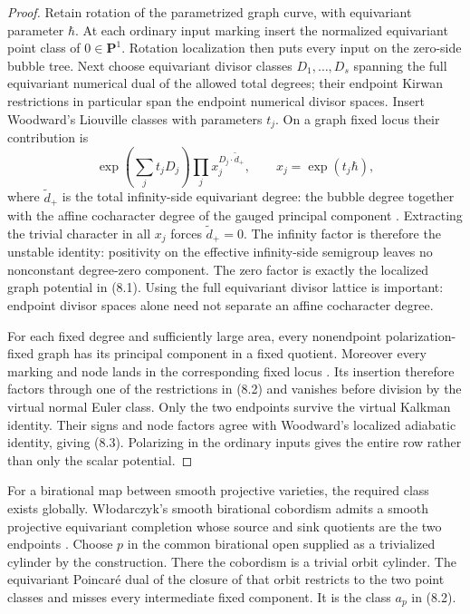 \begin{proof}
Retain rotation of the parametrized graph curve, with equivariant parameter
\(\hbar\).  At each ordinary input marking insert the normalized equivariant
point class of \(0\in\mathbf P^1\).  Rotation localization then puts every
input on the zero-side bubble tree.  Next choose equivariant divisor classes
\(D_1,\ldots,D_s\) spanning the full equivariant numerical dual of the
allowed total degrees; their endpoint Kirwan restrictions in particular span
the endpoint numerical divisor spaces.  Insert Woodward's Liouville classes
with parameters \(t_j\).  On a graph fixed locus their contribution is
\[
 \exp\!\left(\sum_jt_jD_j\right)
 \prod_j x_j^{D_j\cdot \widetilde d_+},
 \qquad x_j=\exp(t_j\hbar),                                  \tag{8.4}
\]
where \(\widetilde d_+\) is the total infinity-side equivariant degree: the
bubble degree together with the affine cocharacter degree of the gauged
principal component \cite[Corollary~9.10(c)]{WoodwardQKIII}.  Extracting the
trivial character in all \(x_j\) forces \(\widetilde d_+=0\).  The infinity
factor is therefore the unstable identity: positivity on the effective
infinity-side semigroup leaves no nonconstant degree-zero component.  The
zero factor is exactly the localized graph potential in (8.1).  Using the
full equivariant divisor lattice is important: endpoint divisor spaces alone
need not separate an affine cocharacter degree.

For each fixed degree and sufficiently large area, every nonendpoint
polarization-fixed graph has its principal component in a fixed quotient.
Moreover every marking and node lands in the corresponding fixed locus
\cite[Proposition~3.15(c), Lemma~3.17 and
Proposition~3.18]{GonzalezWoodward}.  Its insertion therefore factors through
one of the restrictions in (8.2) and vanishes before division by the virtual
normal Euler class.  Only the two endpoints survive the virtual Kalkman
identity.  Their signs and node factors agree with Woodward's localized
adiabatic identity, giving (8.3).  Polarizing in the ordinary inputs gives
the entire row rather than only the scalar potential.
\end{proof}

For a birational map between smooth projective varieties, the required class
exists globally.  W{\l}odarczyk's smooth birational cobordism admits a smooth
projective equivariant completion whose source and sink quotients are the two
endpoints \cite[Proposition~2(B')]{Wlodarczyk}.  Choose \(p\) in the common
birational open supplied as a trivialized cylinder by the construction.
There the cobordism is a trivial orbit cylinder.  The
equivariant Poincar\'e dual of the closure of that orbit restricts to the two
point classes and misses every intermediate fixed component.  It is the
class \(a_p\) in (8.2).

